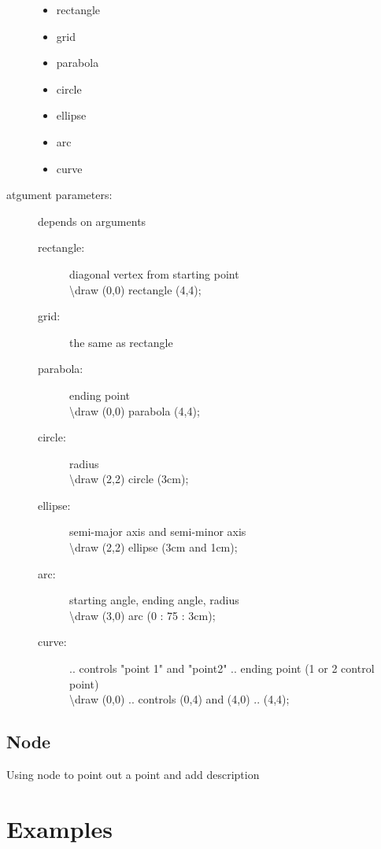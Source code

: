 \documentclass[12pt, a4paper]{article}
\newcommand{\bs}{\textbackslash}
\begin{document}
\begin{description}
\begin{itemize}
	\item rectangle
	\item grid
	\item parabola
	\item circle
	\item ellipse
	\item arc
	\item curve
	\end{itemize}
\item[atgument parameters:] depends on arguments
	\begin{description}
	\item[rectangle:] diagonal vertex from starting point\\
		\bs draw (0,0) rectangle (4,4);
	\item[grid:] the same as rectangle
	\item[parabola:] ending point\\
		\bs draw (0,0) parabola (4,4);
	\item[circle:] radius\\
		\bs draw (2,2) circle (3cm);
	\item[ellipse:] semi-major axis and semi-minor axis\\
		\bs draw (2,2) ellipse (3cm and 1cm);
	\item[arc:] starting angle, ending angle, radius\\
		\bs draw (3,0) arc (0 : 75 : 3cm);
	\item[curve:] .. controls "point 1" and "point2" .. ending point (1 or 2 control point)\\
		\bs draw (0,0) .. controls (0,4) and (4,0) .. (4,4);
	\end{description}
\end{description}

\subsection{Node}
	Using node to point out a point and add description

\section{Examples}
\end{document}
